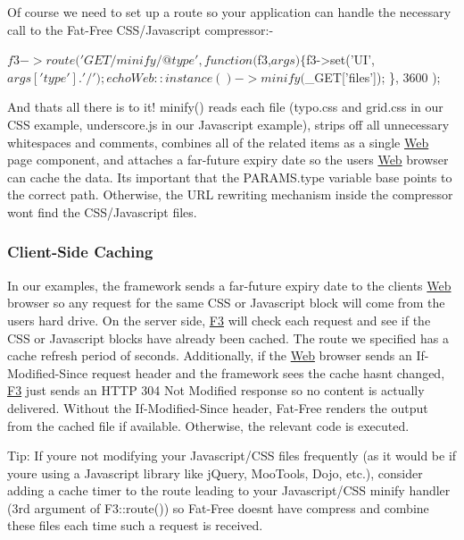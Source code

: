 Of course we need to set up a route so your application can handle the necessary call to the Fat-\/\+Free C\+S\+S/\+Javascript compressor\+:-\/


\begin{DoxyCode}
$f3->route('GET /minify/@type',
    function($f3,$args) \{
        $f3->set('UI',$args['type'].'/');
        echo Web::instance()->minify($\_GET['files']);
    \},
    3600
);
\end{DoxyCode}


And that\textquotesingle{}s all there is to it! {\ttfamily minify()} reads each file ({\ttfamily typo.\+css} and {\ttfamily grid.\+css} in our C\+SS example, {\ttfamily underscore.\+js} in our Javascript example), strips off all unnecessary whitespaces and comments, combines all of the related items as a single \hyperlink{class_web}{Web} page component, and attaches a far-\/future expiry date so the user\textquotesingle{}s \hyperlink{class_web}{Web} browser can cache the data. It\textquotesingle{}s important that the {\ttfamily P\+A\+R\+A\+M\+S.\+type} variable base points to the correct path. Otherwise, the U\+RL rewriting mechanism inside the compressor won\textquotesingle{}t find the C\+S\+S/\+Javascript files.

\subsubsection*{Client-\/\+Side Caching}

In our examples, the framework sends a far-\/future expiry date to the client\textquotesingle{}s \hyperlink{class_web}{Web} browser so any request for the same C\+SS or Javascript block will come from the user\textquotesingle{}s hard drive. On the server side, \hyperlink{class_f3}{F3} will check each request and see if the C\+SS or Javascript blocks have already been cached. The route we specified has a cache refresh period of {} seconds. Additionally, if the \hyperlink{class_web}{Web} browser sends an {\ttfamily If-\/\+Modified-\/\+Since} request header and the framework sees the cache hasn\textquotesingle{}t changed, \hyperlink{class_f3}{F3} just sends an {\ttfamily H\+T\+TP 304 Not Modified} response so no content is actually delivered. Without the {\ttfamily If-\/\+Modified-\/\+Since} header, Fat-\/\+Free renders the output from the cached file if available. Otherwise, the relevant code is executed.

Tip\+: If you\textquotesingle{}re not modifying your Javascript/\+C\+SS files frequently (as it would be if you\textquotesingle{}re using a Javascript library like j\+Query, Moo\+Tools, Dojo, etc.), consider adding a cache timer to the route leading to your Javascript/\+C\+SS minify handler (3rd argument of F3\+::route()) so Fat-\/\+Free doesn\textquotesingle{}t have compress and combine these files each time such a request is received.

